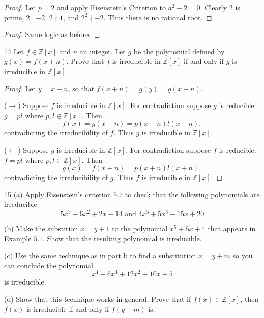 \begin{proof}
    Let $p = 2$ and apply Eisenstein's Criterion to $a^2 - 2 = 0$.
    Clearly $2$ is prime, $2 \mid -2$, $2 \nmid 1$, and $2^2 \nmid -2$.
    Thus there is no rational root.
\end{proof}

\begin{proof}
    Same logic as before.
\end{proof}

\begin{problem}{14}
    Let $f \in \mathbb{Z}[x]$ and $n$ an integer.
    Let $g$ be the polynomial defined by $g(x) = f(x + n)$.
    Prove that $f$ is irreducible in $\mathbb{Z}[x]$ if and 
    only if $g$ is irreducible in $\mathbb{Z}[x]$.
\end{problem}
\solved

\begin{proof}
    Let $y = x - n$, so that $f(x + n) = g(y) = g(x - n)$.

    ($\rightarrow$) Suppose $f$ is irreducible in $\mathbb{Z}[x]$.
    For contradiction suppose $g$ is reducible: $g = p l$ where $p, l \in \mathbb{Z}[x]$.
    Then
    \[
        f(x) = g(x - n) = p(x - n) l(x - n),
    \]
    contradicting the irreducibility of $f$.
    Thus $g$ is irreducible in $\mathbb{Z}[x]$.

    ($\leftarrow$) Suppose $g$ is irreducible in $\mathbb{Z}[x]$.
    For contradiction suppose $f$ is reducible: $f = p l$ where $p, l \in \mathbb{Z}[x]$.
    Then
    \[
        g(x) = f(x + n) = p(x + n) l(x + n),
    \]
    contradicting the irreducibility of $g$.
    Thus $f$ is irreducible in $\mathbb{Z}[x]$.
\end{proof}

\begin{problem}{15}
    (a) Apply Eisenstein's criterion $5.7$ to check that the 
        following polynomials are irreducible
        \[5x^3 - 6x^2 + 2x - 14 \text{ and } 4x^5 + 5x^3 - 15x + 20\]

    (b) Make the substition $x = y + 1$ to the polynomial $x^5 + 5x + 4$
        that appears in Example $5.1$. Show that the resulting polynomial
        is irreducible.

    (c) Use the same technique as in part b to find a substitution 
        $x = y + m$ so you can conclude the polynomial
        \[x^4 + 6x^3 + 12x^2 + 10x + 5\]
        is irreducible.

    (d) Show that this technique works in general: Prove that if 
        $f(x) \in \mathbb{Z}[x]$, then $f(x)$ is irreducible if 
        and only if $f(y + m)$ is.
\end{problem}
\solved

